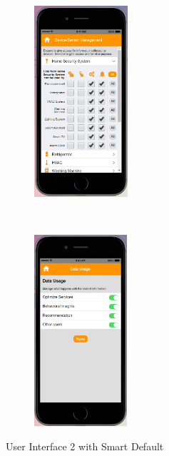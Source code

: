 \begin{figure}
\begin{subfigure}[t]{0.2\textwidth}
	\end{subfigure}%
	~~~~~
	\begin{subfigure}[t]{0.2\textwidth}
		\centering
		\includegraphics[height=2.8in]{figures/ui2sd4.png}
	\end{subfigure}%
	~~~~~
	\begin{subfigure}[t]{0.2\textwidth}
		\centering
		\includegraphics[height=2.8in]{figures/ui2sd5.png}
	\end{subfigure}%
	\caption{User Interface 2 with Smart Default}
	\label{fig:ui2SD}
\end{figure}

